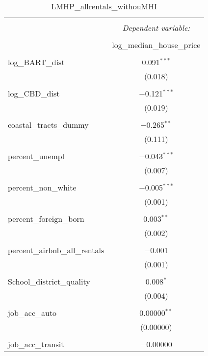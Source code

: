 \documentclass[10pt, letterpaper]{amsart}
\begin{document}
\begin{table}[!htbp] \centering 
  \caption{LMHP\_allrentals\_withouMHI} 
  \label{} 
  \begin{tabular}{@{\extracolsep{5pt}}lc} 
    \\[-1.8ex]\hline 
    \hline \\[-1.8ex] 
    & \multicolumn{1}{c}{\textit{Dependent variable:}} \\ 
    \cline{2-2} 
    \\[-1.8ex] & log\_median\_house\_price \\ 
    \hline \\[-1.8ex] 
    log\_BART\_dist & 0.091$^{***}$ \\ 
    & (0.018) \\ 
    & \\ 
    log\_CBD\_dist & $-$0.121$^{***}$ \\ 
    & (0.019) \\ 
    & \\ 
    coastal\_tracts\_dummy & $-$0.265$^{**}$ \\ 
    & (0.111) \\ 
    & \\ 
    percent\_unempl & $-$0.043$^{***}$ \\ 
    & (0.007) \\ 
    & \\ 
    percent\_non\_white & $-$0.005$^{***}$ \\ 
    & (0.001) \\ 
    & \\ 
    percent\_foreign\_born & 0.003$^{**}$ \\ 
    & (0.002) \\ 
    & \\ 
    percent\_airbnb\_all\_rentals & $-$0.001 \\ 
    & (0.001) \\ 
    & \\ 
    School\_district\_quality & 0.008$^{*}$ \\ 
    & (0.004) \\ 
    & \\ 
    job\_acc\_auto & 0.00000$^{**}$ \\ 
    & (0.00000) \\ 
    & \\ 
    job\_acc\_transit & $-$0.00000 \\ 

\end{tabular}
\end{table}
\end{document}
